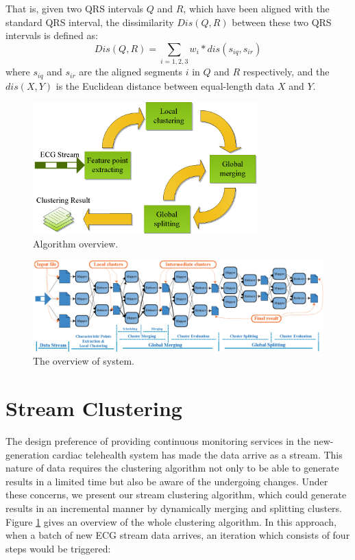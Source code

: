 \documentclass[conference]{IEEEtran}
\begin{document}
That is, given two QRS intervals $ Q $ and $ R $, which have been aligned with the standard QRS interval, the dissimilarity $ Dis(Q, R) $ between these two QRS intervals is defined as:
\begin{equation}\label{eq_dissimilarity}
Dis(Q, R) = \sum_{i=1,2,3}{w_i * dis(s_{iq}, s_{ir} )}
\end{equation}
where $ s_{iq} $ and $ s_{ir} $ are the aligned segments $ i $ in $ Q $ and $ R $ respectively, and the $ dis(X, Y) $ is the Euclidean distance between equal-length data $ X $ and $ Y $.

\begin{figure}[!t]
\centering
\includegraphics[height=2.0in]{./Figure/algorithm_overview.eps}
\caption{Algorithm overview.}
\label{fig_algorithm_overview}
\end{figure}

\begin{figure}[!t]
\centering
\includegraphics[width=7.1in]{./Figure/system_overview.eps}
\caption{The overview of system.}
\label{fig_sys_overview}
\end{figure}
\section{Stream Clustering}
The design preference of providing continuous monitoring services in the new-generation cardiac telehealth system has made the data arrive as a stream. This nature of data requires the clustering algorithm not only to be able to generate results in a limited time but also be aware of the undergoing changes. Under these concerns, we present our stream clustering algorithm, which could generate results in an incremental manner by dynamically merging and splitting clusters. Figure \ref{fig_algorithm_overview} gives an overview of the whole clustering algorithm. In this approach, when a batch of new ECG stream data arrives, an iteration which consists of four steps would be triggered: 
\end{document}
